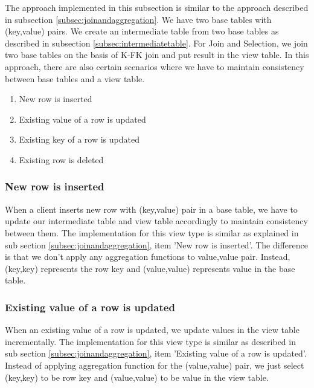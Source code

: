\documentclass[11pt,a4paper,bibtotoc,idxtotoc,headsepline,footsepline,footexclude,BCOR12mm,DIV13]{scrbook}
\begin{document}
The approach implemented in this subsection is similar to the approach described in subsection \ref{subsec:joinandaggregation}. We have two base tables with (key,value) pairs. We create an intermediate table from two base tables as described in subsection \ref{subsec:intermediatetable}. For Join and Selection, we join two base tables on the basis of K-FK join and put result in the view table. In this approach, there are also certain scenarios where we have to maintain consistency between base tables and a view table.

\begin{enumerate}
	\item New row is inserted
	\item Existing value of a row is updated
	\item Existing key of a row is updated
	\item Existing row is deleted
\end{enumerate}

\subsubsection{New row is inserted}
\label{New row is inserted JoinSelection}
When a client inserts new row with (key,value) pair in a base table, we have to update our intermediate table and view table accordingly to maintain consistency between them. The implementation for this view type is similar as explained in sub section \ref{subsec:joinandaggregation}, item 'New row is inserted'. The difference is that we don't apply any aggregation functions to value,value pair. Instead, (key,key) represents the row key and (value,value) represents value in the base table.

\subsubsection{Existing value of a row is updated} 

When an existing value of a row is updated, we update values in the view table incrementally. The implementation for this view type is similar as described in sub section \ref{subsec:joinandaggregation}, item 'Existing value of a row is updated'. Instead of applying aggregation function for the (value,value) pair, we just select (key,key) to be row key and (value,value) to be value in the view table. 
\end{document}
